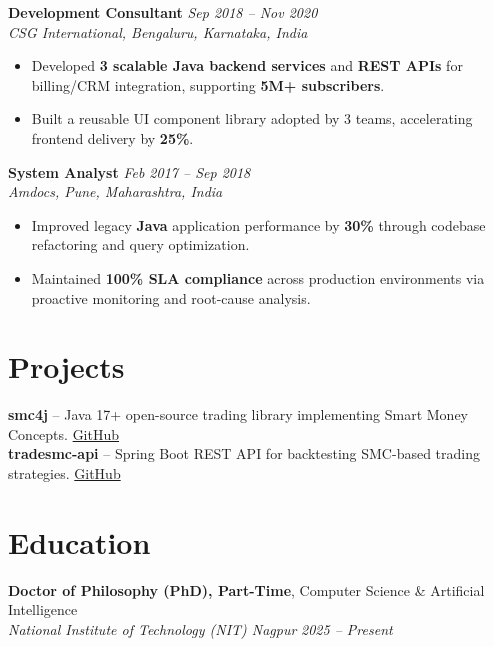 \documentclass[10pt,a4paper]{article}
\begin{document}
\vspace{0.5pt}
\textbf{Development Consultant} \hfill \textit{Sep 2018 -- Nov 2020}\\[-1pt]
\textit{CSG International, Bengaluru, Karnataka, India}
\begin{itemize}[label=\textbullet]
  \item Developed \textbf{3 scalable Java backend services} and \textbf{REST APIs} for billing/CRM integration, supporting \textbf{5M+ subscribers}.
  \item Built a reusable UI component library adopted by 3 teams, accelerating frontend delivery by \textbf{25\%}.
\end{itemize}

\vspace{0.5pt}
\textbf{System Analyst} \hfill \textit{Feb 2017 -- Sep 2018}\\[-1pt]
\textit{Amdocs, Pune, Maharashtra, India}
\begin{itemize}[label=\textbullet]
  \item Improved legacy \textbf{Java} application performance by \textbf{30\%} through codebase refactoring and query optimization.
  \item Maintained \textbf{100\% SLA compliance} across production environments via proactive monitoring and root-cause analysis.
\end{itemize}

\vspace{1pt}
\section{Projects}
\vspace{0.5pt}
\textbf{smc4j} -- Java 17+ open-source trading library implementing Smart Money Concepts. \href{https://github.com/smc4j/smc4j}{GitHub} \\
\textbf{tradesmc-api} -- Spring Boot REST API for backtesting SMC-based trading strategies. \href{https://github.com/dharamcodes/tradesmc-api}{GitHub}

\vspace{1pt}
\section{Education}
\vspace{0.5pt}
\textbf{Doctor of Philosophy (PhD), Part-Time}, Computer Science \& Artificial Intelligence\\[-1pt]
\textit{National Institute of Technology (NIT) Nagpur} \hfill \textit{2025 -- Present}
\end{document}
